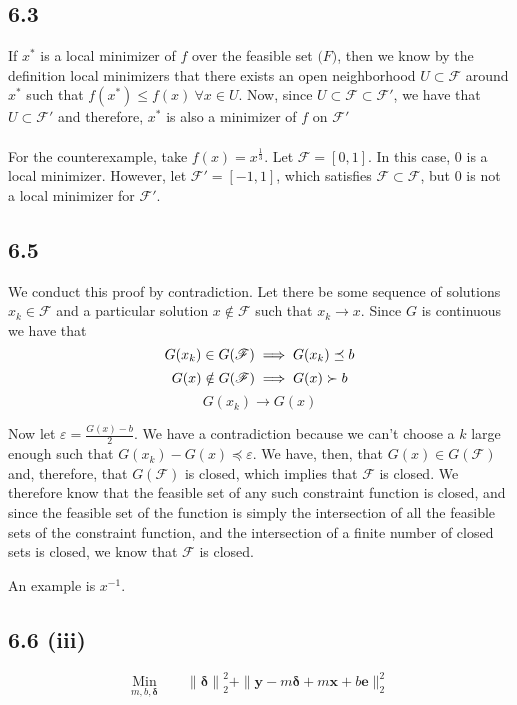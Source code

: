 \documentclass[letterpaper,12pt]{article}
\theoremstyle{definition}
\begin{document}
\subsection*{6.3}
If $x^*$ is a local minimizer of $f$ over the feasible set $\mathcal(F)$, then we know by the definition local minimizers that there exists an open neighborhood $U \subset \mathscr{F}$ around $x^*$ such that $f(x^*) \leq f(x) ~\forall x \in U$. Now, since $U\subset \mathscr{F} \subset \mathscr{F}'$, we have that $U \subset \mathscr{F}'$ and therefore, $x^*$ is also a minimizer of $f$ on $\mathscr{F}'$ 
\\
\\
For the counterexample, take $f(x) = x^\frac{1}{3}$. Let $\mathscr{F} = [0,1]$. In this case, $0$ is a local minimizer. However, let $\mathscr{F}' = [-1,1]$, which satisfies $\mathscr{F} \subset \mathscr{F}$, but $0$ is not a local minimizer for $\mathscr{F}'$.


\subsection*{6.5}

We conduct this proof by contradiction. Let there be some sequence of solutions $x_k \in \mathscr{F}$ and a particular solution $x \notin \mathscr{F} $ such that $x_k \to x$. Since $G$ is continuous we have that 
\[G(x_k) \in G(\mathscr{F}) \\ \implies G(x_k) \preceq b\] 
\[G(x) \notin G(\mathscr{F}) \\ \implies G(x) \succ b\]
\[G(x_k) \to G(x)\]

Now let $\varepsilon = \frac{G(x) - b}{2}$. We have a contradiction  because we can't choose a $k$ large enough such that $G(x_k) - G(x) \preceq \varepsilon$. We have, then, that $G(x) \in G(\mathscr{F})$ and, therefore, that $G(\mathscr{F})$ is closed, which implies that $\mathscr{F}$ is closed. 
We therefore know that the feasible set of any such constraint function is closed, and since the feasible set of the function is simply the intersection of all the feasible sets of the constraint function, and the intersection of a finite number of closed sets is closed, we know that $\mathscr{F}$ is closed. 

An example is $x^{-1}$.

\subsection*{6.6 (iii)}
\[\underset{m,b,\boldsymbol{\delta}}{\text{Min}}\qquad{\|  \boldsymbol{\delta}  \|}^2_2 + \|\mathbf{y} - m \boldsymbol{\delta} + m \mathbf{x} + b \mathbf{e}  \|_2^2\]
\end{document}
